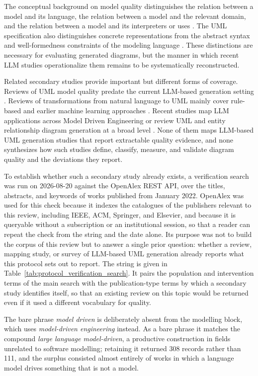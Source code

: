 The conceptual background on model quality distinguishes the relation between a model and its language, the relation between a model and the relevant domain, and the relation between a model and its interpreters or uses \cite{Lindland1994Quality,Krogstie2006Process}. The UML specification also distinguishes concrete representations from the abstract syntax and well-formedness constraints of the modeling language \cite{OMG2017UML}. These distinctions are necessary for evaluating generated diagrams, but the manner in which recent LLM studies operationalize them remains to be systematically reconstructed.

Related secondary studies provide important but different forms of coverage. Reviews of UML model quality predate the current LLM-based generation setting \cite{Genero2011UMLQuality}. Reviews of transformations from natural language to UML mainly cover rule-based and earlier machine learning approaches \cite{Ahmed2022NaturalUML}. Recent studies map LLM applications across Model Driven Engineering or review UML and entity relationship diagram generation at a broad level \cite{Zhang2027LLMMDE,Rahmanian2026Diagrams}. None of them maps LLM-based UML generation studies that report extractable quality evidence, and none synthesizes how such studies define, classify, measure, and validate diagram quality and the deviations they report.

To establish whether such a secondary study already exists, a verification search was run on 2026-08-20 against the OpenAlex REST API, over the titles, abstracts, and keywords of works published from January 2022. OpenAlex was used for this check because it indexes the catalogues of the publishers relevant to this review, including IEEE, ACM, Springer, and Elsevier, and because it is queryable without a subscription or an institutional session, so that a reader can repeat the check from the string and the date alone. Its purpose was not to build the corpus of this review but to answer a single prior question: whether a review, mapping study, or survey of LLM-based UML generation already reports what this protocol sets out to report. The string is given in Table~\ref{tab:protocol_verification_search}. It pairs the population and intervention terms of the main search with the publication-type terms by which a secondary study identifies itself, so that an existing review on this topic would be returned even if it used a different vocabulary for quality.

The bare phrase \textit{model driven} is deliberately absent from the modelling block, which uses \textit{model-driven engineering} instead. As a bare phrase it matches the compound \textit{large language model-driven}, a productive construction in fields unrelated to software modelling; retaining it returned 308 records rather than 111, and the surplus consisted almost entirely of works in which a language model drives something that is not a model.

